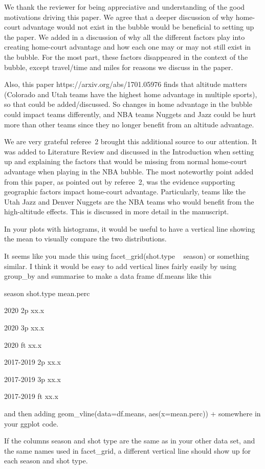 \documentclass[12pt]{article}
\newenvironment{comment}%
{\begin{quoting}\noindent\small\it\ignorespaces%
  }{\end{quoting}}
\begin{document}
 We thank the reviewer for being appreciative and understanding of the good motivations driving this paper. We agree that a deeper discussion of why home-court advantage would not exist in the bubble would be beneficial to setting up the paper. We added in a discussion of why all the different factors play into creating home-court advantage and how each one may or may not still exist in the bubble. For the most part, these factors disappeared in the context of the bubble, except travel/time and miles for reasons we discuss in the paper. 

\begin{comment}
Also, this paper https://arxiv.org/abs/1701.05976 finds that altitude matters (Colorado and Utah teams
have the highest home advantage in multiple sports), so that could be added/discussed. So changes in home
advantage in the bubble could impact teams differently, and NBA teams Nuggets and Jazz could be hurt
more than other teams since they no longer benefit from an altitude advantage.
\end{comment}

 We are very grateful referee~2 brought this additional source to our attention. It was added to Literature Review and discussed in the Introduction when setting up and explaining the factors that would be missing from normal home-court advantage when playing in the NBA bubble. The most noteworthy point added from this paper, as pointed out by referee~2, was the evidence supporting geographic factors impact home-court advantage. Particularly, teams like the Utah Jazz and Denver Nuggets are the NBA teams who would benefit from the high-altitude effects. This is discussed in more detail in the manuscript.
 
\begin{comment}
In your plots with histograms, it would be useful to have a vertical line showing the mean to visually compare
the two distributions.

It seems like you made this using facet\_grid(shot.type ~ season) or something similar. I think it would
be easy to add vertical lines fairly easily by using group\_by and summarise to make a data frame df.means
like this

season shot.type mean.perc

2020 2p xx.x

2020 3p xx.x

2020 ft xx.x

2017-2019 2p xx.x

2017-2019 3p xx.x

2017-2019 ft xx.x

and then adding
geom\_vline(data=df.means, aes(x=mean.perc)) +
somewhere in your ggplot code.

If the columns season and shot type are the same as in your other data
set, and the same names used in facet\_grid, a different vertical line should show up for each season and shot type.
\end{comment}
\end{document}
